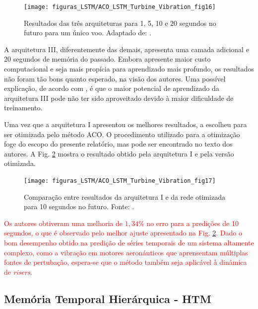 \begin{figure}[H]
	\centering
	{\texttt{[image: figuras\_LSTM/ACO\_LSTM\_Turbine\_Vibration\_fig16]}}
	\caption{Resultados das três arquiteturas para 1, 5, 10 e 20 segundos no futuro para um único voo. Adaptado de: .}
	\label{fig:lstm_aco_results2}
\end{figure}

A arquitetura III, diferentemente das demais, apresenta uma camada adicional e 20 segundos de memória do passado. Embora apresente maior custo computacional e seja mais propícia para aprendizado mais profundo, os resultados não foram tão bons quanto esperado, na visão dos autores. Uma possível explicação, de acordo com  , é que o maior potencial de aprendizado da arquitetura III pode não ter sido aproveitado devido à maior dificuldade de treinamento.

Uma vez que a arquitetura I apresentou os melhores resultados,  a escolheu para ser otimizada pelo método ACO. O procedimento utilizado para a otimização foge do escopo do presente relatório, mas pode ser encontrado no texto dos autores. A Fig. \ref{fig:lstm_aco_results3} mostra o resultado obtido pela arquitetura I e pela versão otimizada. 

\begin{figure}[H]
	\centering
	
	{\texttt{[image: figuras\_LSTM/ACO\_LSTM\_Turbine\_Vibration\_fig17]}}
	
	\caption{Comparação entre resultados da arquitetura I e da rede otimizada para 10 segundos no futuro. Fonte: .}
	\label{fig:lstm_aco_results3}
\end{figure}

\textcolor{red}{Os autores obtiveram uma melhoria de $1,34\%$ no erro para a predições de 10 segundos, o que é observado pelo melhor ajuste apresentado na Fig. \ref{fig:lstm_aco_results3}. Dado o bom desempenho obtido na predição de séries temporais de um sistema altamente complexo, como a vibração em motores aeronáuticos que aprensentam múltiplas fontes de pertubação, espera-se que o método também seja aplicável à dinâmica de \textit{risers}}.

%

\subsection{Memória Temporal Hierárquica - HTM}


